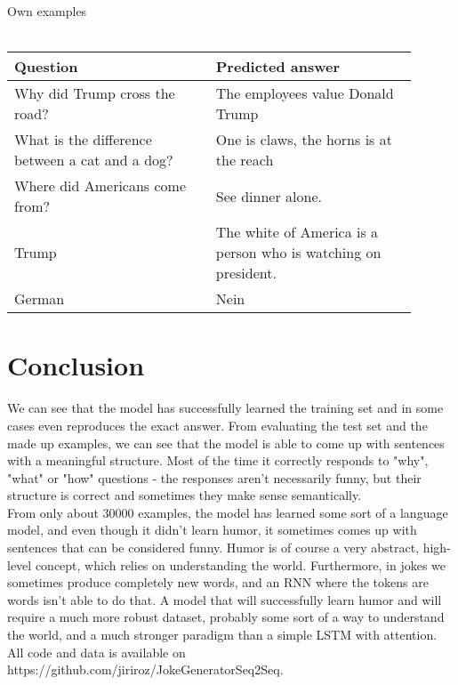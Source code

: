 \documentclass[12pt]{article}
\begin{document}
\vspace{1cm}
Own examples \\\\
\begin{tabular}{ |p{0.45\linewidth}|p{0.45\linewidth}| } 
         \hline
      \textbf{Question} & \textbf{Predicted answer} \\ 
     \hline
       Why did Trump cross the road? & The employees value Donald Trump \\ 
     \hline
       What is the difference between a cat and a dog? & One is claws, the horns is at the reach \\
     \hline
       Where did Americans come from? & See dinner alone. \\
     \hline
       Trump & The white of America is a person who is watching on president.\\
     \hline
       German & Nein \\
         \hline
\end{tabular}

\section{Conclusion}

We can see that the model has successfully learned the training set and in some cases even reproduces the exact answer. From evaluating the test set and the made up examples, we can see that the model is able to come up with sentences with a meaningful structure. Most of the time it correctly responds to "why", "what" or "how" questions - the responses aren't necessarily funny, but their structure is correct and sometimes they make sense semantically. \\

From only about 30000 examples, the model has learned some sort of a language model, and even though it didn't learn humor, it sometimes comes up with sentences that can be considered funny. Humor is of course a very abstract, high-level concept, which relies on understanding the world. Furthermore, in jokes we sometimes produce completely new words, and an RNN where the tokens are words isn't able to do that. A model that will successfully learn humor and will require a much more robust dataset, probably some sort of a way to understand the world, and a much stronger paradigm than a simple LSTM with attention.\\

All code and data is available on https://github.com/jiriroz/JokeGeneratorSeq2Seq.
\end{document}
